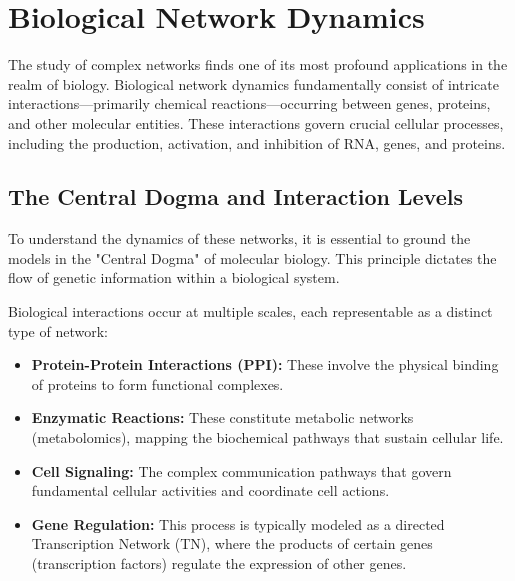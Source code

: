 \section{Biological Network Dynamics}
\label{sec:biological_dynamics}

The study of complex networks finds one of its most profound applications in the realm of biology. Biological network dynamics fundamentally consist of intricate interactions—primarily chemical reactions—occurring between genes, proteins, and other molecular entities. These interactions govern crucial cellular processes, including the production, activation, and inhibition of RNA, genes, and proteins.

\subsection{The Central Dogma and Interaction Levels}
\label{subsec:biology_dogma_interactions}

To understand the dynamics of these networks, it is essential to ground the models in the "Central Dogma" of molecular biology. This principle dictates the flow of genetic information within a biological system.


Biological interactions occur at multiple scales, each representable as a distinct type of network:
\begin{itemize}
    \item \textbf{Protein-Protein Interactions (PPI):} These involve the physical binding of proteins to form functional complexes.
    \item \textbf{Enzymatic Reactions:} These constitute metabolic networks (metabolomics), mapping the biochemical pathways that sustain cellular life.
    \item \textbf{Cell Signaling:} The complex communication pathways that govern fundamental cellular activities and coordinate cell actions.
    \item \textbf{Gene Regulation:} This process is typically modeled as a directed Transcription Network (TN), where the products of certain genes (transcription factors) regulate the expression of other genes.
\end{itemize}


